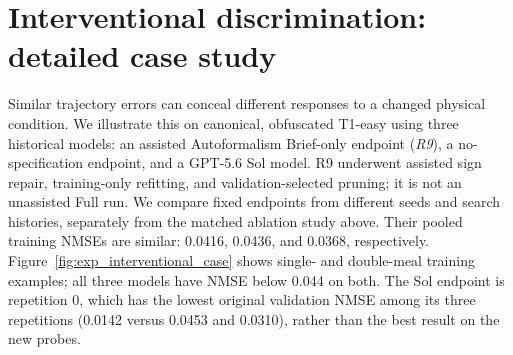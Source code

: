 \providecommand{\AFCaseStudyFigures}{output/pdf/assisted-r9-case-study}

\section{Interventional discrimination: detailed case study}
\label{app:interventional_discrimination}

Similar trajectory errors can conceal different responses to a changed
physical condition. We illustrate this on canonical, obfuscated T1-easy using
three historical models: an assisted Autoformalism Brief-only endpoint
(\emph{R9}), a no-specification endpoint, and a GPT-5.6 Sol model. R9 underwent
assisted sign repair, training-only refitting, and validation-selected pruning;
it is not an unassisted Full run. We compare fixed endpoints from different
seeds and search histories, separately from the matched ablation study above.
Their pooled training NMSEs are similar: 0.0416, 0.0436, and 0.0368,
respectively. Figure~\ref{fig:exp_interventional_case} shows single- and
double-meal training examples; all three models have
NMSE below 0.044 on both. The Sol endpoint is repetition 0, which has the
lowest original validation NMSE among its three repetitions
(0.0142 versus 0.0453 and 0.0310), rather than the best result on the new probes.

